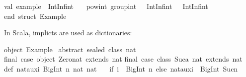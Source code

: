\begin{isabellebody}
\begin{isamarkuptext}
\isanewline
val\ example\ {}\ IntInf{}int\ {}\isanewline
\ \ pow{}int\ group{}int\ {}{}{}\ {}\ IntInf{}int{}\ {}{}{}\ {}\ IntInf{}int{}{}\isanewline
\isanewline
end{}\ {}{}struct\ Example{}{}\isanewline%
\end{isamarkuptext}%
\isamarkuptrue%
%
\endisatagquotetypewriter
{\isafoldquotetypewriter}%
%
\isadelimquotetypewriter
%
\endisadelimquotetypewriter
%
\begin{isamarkuptext}%
\noindent In Scala, implicts are used as dictionaries:%
\end{isamarkuptext}%
\isamarkuptrue%
%
\isadeliminvisible
%
\endisadeliminvisible
%
\isataginvisible
%
\endisataginvisible
{\isafoldinvisible}%
%
\isadeliminvisible
%
\endisadeliminvisible
%
\isadelimquotetypewriter
%
\endisadelimquotetypewriter
%
\isatagquotetypewriter
%
\begin{isamarkuptext}%
object\ Example\ {}\isanewline
\isanewline
abstract\ sealed\ class\ nat\isanewline
final\ case\ object\ Zero{}nat\ extends\ nat\isanewline
final\ case\ class\ Suc{}a{}\ nat{}\ extends\ nat\isanewline
\isanewline
def\ nat{}aux{}i{}\ BigInt{}\ n{}\ nat{}{}\ nat\ {}\isanewline
\ \ {}if\ {}i\ {}{}\ BigInt{}{}{}{}\ n\ else\ nat{}aux{}i\ {}\ BigInt{}{}{}{}\ Suc{}n{}{}{}\isanewline

\end{isamarkuptext}
\end{isabellebody}
